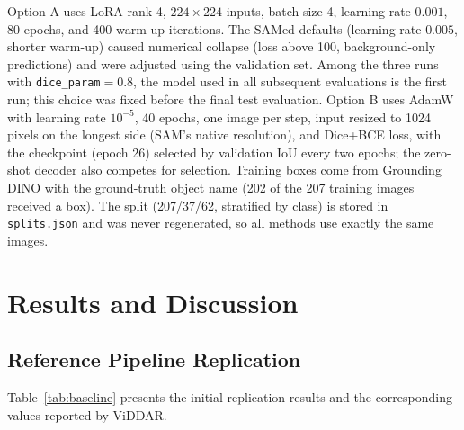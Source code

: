 \documentclass[conference]{IEEEtran}
\begin{document}
Option A uses LoRA rank 4, $224\times224$ inputs, batch size 4, learning rate $0.001$, 80 epochs, and 400 warm-up iterations. The SAMed defaults (learning rate $0.005$, shorter warm-up) caused numerical collapse (loss above 100, background-only predictions) and were adjusted using the validation set. Among the three runs with \texttt{dice\_param}$=0.8$, the model used in all subsequent evaluations is the first run; this choice was fixed before the final test evaluation. Option B uses AdamW with learning rate $10^{-5}$, 40 epochs, one image per step, input resized to 1024 pixels on the longest side (SAM's native resolution), and Dice+BCE loss, with the checkpoint (epoch 26) selected by validation IoU every two epochs; the zero-shot decoder also competes for selection. Training boxes come from Grounding DINO with the ground-truth object name (202 of the 207 training images received a box). The split (207/37/62, stratified by class) is stored in \texttt{splits.json} and was never regenerated, so all methods use exactly the same images.



\section{Results and Discussion}

\subsection{Reference Pipeline Replication}

Table~\ref{tab:baseline} presents the initial replication results and the corresponding values reported by ViDDAR.

\begin{table}[t]
\centering
\caption{Reference pipeline replication and values reported by ViDDAR. All values are computed over the full dataset (306 images) and are therefore not directly comparable with the validation/test values of Table~\ref{tab:seg}.}
\label{tab:baseline}
\end{table}
\end{document}

